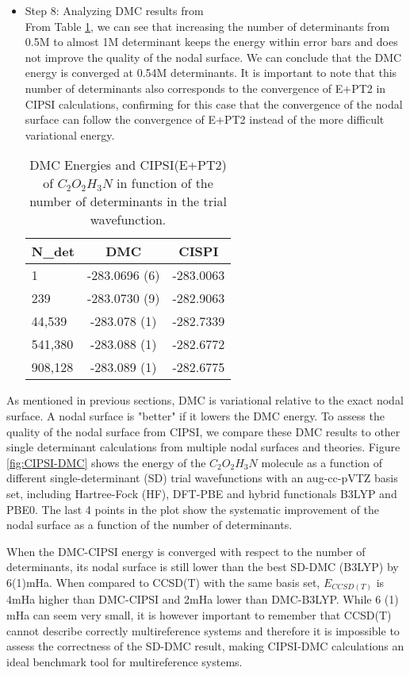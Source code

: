 \begin{itemize}
\item Step 8: Analyzing DMC results from \qmcpack \\

From Table \ref{TAB:CIPSI-DMC}, we can see that increasing the number
of determinants from 0.5M to almost 1M determinant keeps the energy
within error bars and does not improve the quality of the nodal
surface. We can conclude that the DMC energy is converged at 0.54M
determinants. It is important to note that this number of determinants
also corresponds to the convergence of E+PT2 in CIPSI calculations,
confirming for this case that the convergence of the nodal surface can
follow the convergence of E+PT2 instead of the more difficult
variational energy.


\begin{table}[t]
\centering
\caption{DMC Energies and CIPSI(E+PT2) of $C_2O_2H_3N$ in function of the number of determinants in the trial wavefunction.}
\label{TAB:CIPSI-DMC}
\begin{tabular}{l|c|c}
\hline 
N\_det & DMC& CISPI\\
\hline
1 & -283.0696 (6)&-283.0063\\
239 & -283.0730 (9)&-282.9063\\
44,539 & -283.078 (1)&-282.7339\\
541,380 & -283.088 (1)&-282.6772\\
908,128& -283.089  (1)&-282.6775\end{tabular}
\end{table}

\end{itemize}

As mentioned in previous sections, DMC is variational relative to the
exact nodal surface. A nodal surface is "better" if it lowers the DMC
energy. To assess the quality of the nodal surface from CIPSI, we
compare these DMC results to other single determinant calculations
from multiple nodal surfaces and theories. Figure \ref{fig:CIPSI-DMC}
shows the energy of the $C_2O_2H_3N$ molecule as a function of
different single-determinant (SD) trial wavefunctions with an
aug-cc-pVTZ basis set, including Hartree-Fock (HF), DFT-PBE and hybrid
functionals B3LYP and PBE0. The last 4 points in the plot show the
systematic improvement of the nodal surface as a function of the
number of determinants. 

When the DMC-CIPSI energy is converged with respect to the number of
determinants, its nodal surface is still lower than the best SD-DMC
(B3LYP) by 6(1)mHa. When compared to CCSD(T) with the same basis set,
$E_{CCSD(T)}$ is 4mHa higher than DMC-CIPSI and 2mHa lower than
DMC-B3LYP. While 6 (1) mHa can seem very small, it is however
important to remember that CCSD(T) cannot describe correctly
multireference systems and therefore it is impossible to assess the
correctness of the SD-DMC result, making CIPSI-DMC calculations an
ideal benchmark tool for multireference systems.

